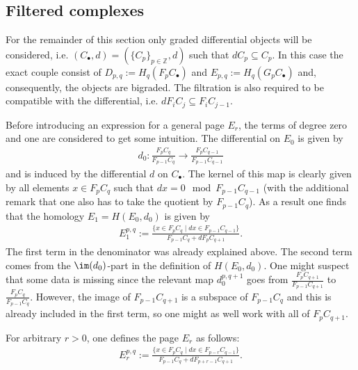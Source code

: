 \subsection{Filtered complexes}

	For the remainder of this section only graded differential objects will be considered, i.e. $(C_\bullet,d)=(\{C_p\}_{p\in\mathbb{Z}},d)$ such that $dC_p\subseteq C_p$. In this case the exact couple consist of $D_{p,q}:=H_q(F_pC_\bullet)$ and $E_{p,q}:=H_q(G_pC_\bullet)$ and, consequently, the objects are bigraded. The filtration is also required to be compatible with the differential, i.e. $dF_iC_j\subseteq F_iC_{j-1}$.


	Before introducing an expression for a general page $E_r$, the terms of degree zero and one are considered to get some intuition. The differential on $E_0$ is given by
	\begin{gather}
		d_0:\frac{F_pC_q}{F_{p-1}C_q}\rightarrow\frac{F_pC_{q-1}}{F_{p-1}C_{q-1}}
	\end{gather}
	and is induced by the differential $d$ on $C_\bullet$. The kernel of this map is clearly given by all elements $x\in F_pC_q$ such that $dx = 0\mod F_{p-1}C_{q-1}$ (with the additional remark that one also has to take the quotient by $F_{p-1}C_q$). As a result one finds that the homology $E_1=H(E_0, d_0)$ is given by
	\begin{gather}
		E_1^{p,q}:=\frac{\{x\in F_pC_q\mid dx\in F_{p-1}C_{q-1}\}}{F_{p-1}C_q+dF_pC_{q+1}}.
	\end{gather}
	The first term in the denominator was already explained above. The second term comes from the $\im(d_0)$-part in the definition of $H(E_0,d_0)$. One might suspect that some data is missing since the relevant map $d_0^{p, q+1}$ goes from $\frac{F_pC_{q+1}}{F_{p-1}C_{q+1}}$ to $\frac{F_pC_q}{F_{p-1}C_{q}}$. However, the image of $F_{p-1}C_{q+1}$ is a subspace of $F_{p-1}C_q$ and this is already included in the first term, so one might as well work with all of $F_pC_{q+1}$.

	For arbitrary $r>0$, one defines the page $E_r$ as follows:
	\begin{gather}
    	E_r^{p,q}:=\frac{\{x\in F_pC_q\mid dx\in F_{p-r}C_{q-1}\}}{F_{p-1}C_q+dF_{p+r-1}C_{q+1}}.
	\end{gather}

